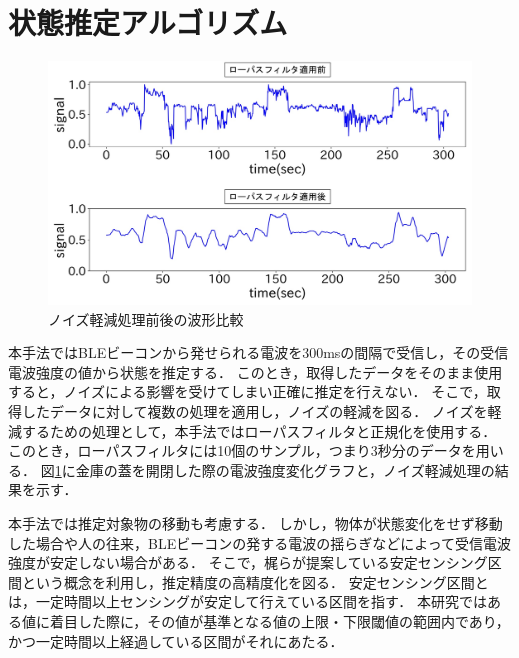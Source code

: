 

\section{状態推定アルゴリズム}

\begin{figure}[tbh]
    \centering
    \includegraphics[width=14cm]{images/chapter3/lowpath_compare.jpg}
    \caption{ノイズ軽減処理前後の波形比較}
    \label{bank-opcl}
\end{figure}

本手法ではBLEビーコンから発せられる電波を300msの間隔で受信し，その受信電波強度の値から状態を推定する．
このとき，取得したデータをそのまま使用すると，ノイズによる影響を受けてしまい正確に推定を行えない．
そこで，取得したデータに対して複数の処理を適用し，ノイズの軽減を図る．
ノイズを軽減するための処理として，本手法ではローパスフィルタと正規化を使用する．
このとき，ローパスフィルタには10個のサンプル，つまり3秒分のデータを用いる．
図\ref{bank-opcl}に金庫の蓋を開閉した際の電波強度変化グラフと，ノイズ軽減処理の結果を示す．

本手法では推定対象物の移動も考慮する．
しかし，物体が状態変化をせず移動した場合や人の往来，BLEビーコンの発する電波の揺らぎなどによって受信電波強度が安定しない場合がある．
そこで，梶ら\cite{sensing-area}が提案している安定センシング区間という概念を利用し，推定精度の高精度化を図る．
安定センシング区間とは，一定時間以上センシングが安定して行えている区間を指す．
本研究ではある値に着目した際に，その値が基準となる値の上限・下限閾値の範囲内であり，かつ一定時間以上経過している区間がそれにあたる．

